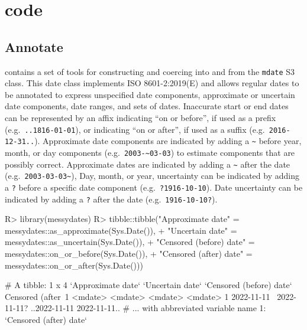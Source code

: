 \documentclass[
]{jss}
\begin{document}
\section[R code]{ code}\label{r-code}

\hypertarget{annotate}{%
\subsection{Annotate}\label{annotate}}

 contains a set of tools for constructing and coercing
into and from the \texttt{mdate} S3 class. This date class implements
ISO 8601-2:2019(E) and allows regular dates to be annotated to express
unspecified date components, approximate or uncertain date components,
date ranges, and sets of dates. Inaccurate start or end dates can be
represented by an affix indicating ``on or before'', if used as a prefix
(e.g.~\texttt{..1816-01-01}), or indicating ``on or after'', if used as
a suffix (e.g.~\texttt{2016-12-31..}). Approximate date components are
indicated by adding a \texttt{\textasciitilde{}} before year, month, or
day components (e.g.~\texttt{2003-\textasciitilde{}03-03}) to estimate
components that are possibly correct. Approximate dates are indicated by
adding a \texttt{\textasciitilde{}} after the date
(e.g.~\texttt{2003-03-03\textasciitilde{}}), Day, month, or year,
uncertainty can be indicated by adding a \texttt{?} before a specific
date component (e.g.~\texttt{?1916-10-10}). Date uncertainty can be
indicated by adding a \texttt{?} after the date
(e.g.~\texttt{1916-10-10?}).

\begin{CodeChunk}
\begin{CodeInput}
R> library(messydates)
R> tibble::tibble("Approximate date" = messydates::as_approximate(Sys.Date()), 
+                "Uncertain date" = messydates::as_uncertain(Sys.Date()),
+                "Censored (before) date" = messydates::on_or_before(Sys.Date()),
+                "Censored (after) date" = messydates::on_or_after(Sys.Date()))
\end{CodeInput}
\begin{CodeOutput}
# A tibble: 1 x 4
  `Approximate date` `Uncertain date` `Censored (before) date` Censored (after~1
  <mdate>            <mdate>          <mdate>                  <mdate>          
1 2022-11-11~        2022-11-11?      ..2022-11-11             2022-11-11..     
# ... with abbreviated variable name 1: `Censored (after) date`
\end{CodeOutput}
\end{CodeChunk}
\end{document}
